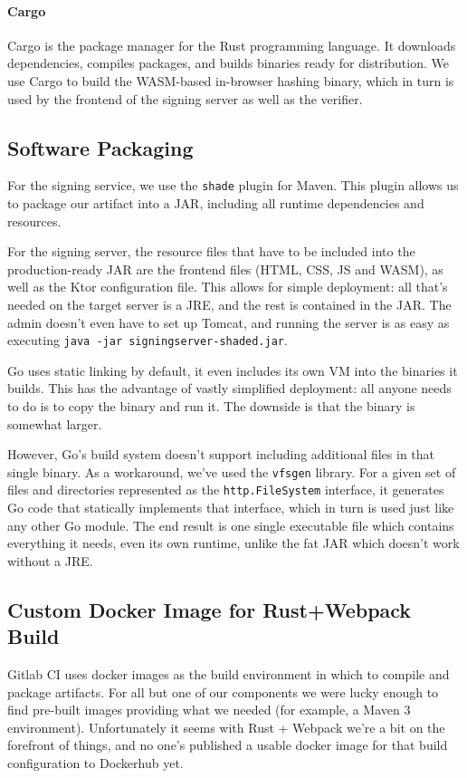 \paragraph{Cargo} Cargo is the package manager for the Rust programming language.
It downloads dependencies, compiles packages,
and builds binaries ready for distribution.
We use Cargo to build the \gls{WASM}-based in-browser hashing binary,
which in turn is used by the frontend of the signing server as well as the verifier.

\subsection{Software Packaging}\label{subsec:software-packaging}
For the signing service,
we use the \texttt{shade} plugin for Maven.
This plugin allows us to package our artifact into a \gls{JAR},
including all runtime dependencies and resources.

For the signing server,
the resource files that have to be included into the production-ready \gls{JAR}
are the frontend files (\gls{HTML}, \gls{CSS}, \gls{JS} and \gls{WASM}),
as well as the Ktor configuration file.
This allows for simple deployment:
all that's needed on the target server is a \gls{JRE},
and the rest is contained in the \gls{JAR}.
The admin doesn't even have to set up Tomcat,
and running the server is as easy as executing \texttt{java -jar signingserver-shaded.jar}.

Go uses static linking by default,
it even includes its own \gls{VM} into the binaries it builds.
This has the advantage of vastly simplified deployment:
all anyone needs to do is to copy the binary and run it.
The downside is that the binary is somewhat larger.

However, Go's build system doesn't support including additional files in that single binary.
As a workaround, we've used the \texttt{vfsgen} library.
For a given set of files and directories represented as the \texttt{http.FileSystem} interface,
it generates Go code that statically implements that interface,
which in turn is used just like any other Go module.
The end result is one single executable file which contains everything it needs,
even its own runtime, unlike the fat \gls{JAR} which doesn't work without a \gls{JRE}.

\subsection{Custom Docker Image for Rust+Webpack Build}\label{subsec:custom-docker-image-for-rust+webpack-build}
Gitlab \gls{CI} uses docker images as the build environment in which to compile and package artifacts.
For all but one of our components we were lucky enough to find pre-built images providing what we needed (for example, a Maven 3 environment).
Unfortunately it seems with Rust + Webpack we're a bit on the forefront of things,
and no one's published a usable docker image for that build configuration to Dockerhub yet.

